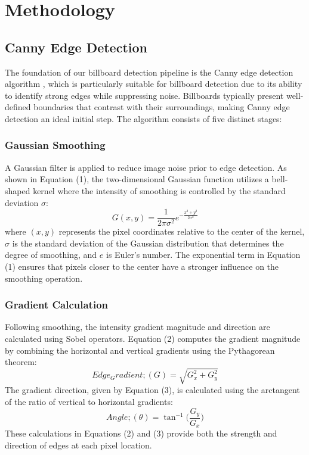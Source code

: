 \documentclass[12pt]{article}
\begin{document}
\section{Methodology}

\subsection{Canny Edge Detection}%
The foundation of our billboard detection pipeline is the Canny edge detection algorithm \cite{canny1986computational}, which is particularly suitable for billboard detection due to its ability to identify strong edges while suppressing noise. Billboards typically present well-defined boundaries that contrast with their surroundings, making Canny edge detection an ideal initial step. The algorithm consists of five distinct stages:

\subsubsection{Gaussian Smoothing}
A Gaussian filter\cite{Gauss} is applied to reduce image noise prior to edge detection. As shown in Equation (1), the two-dimensional Gaussian function utilizes a bell-shaped kernel where the intensity of smoothing is controlled by the standard deviation $\sigma$:
\begin{equation}
G(x,y) = \frac{1}{2\pi\sigma^2}e^{-\frac{x^2+y^2}{2\sigma^2}}
\end{equation}
where $(x,y)$ represents the pixel coordinates relative to the center of the kernel, $\sigma$ is the standard deviation of the Gaussian distribution that determines the degree of smoothing, and $e$ is Euler's number. The exponential term in Equation (1) ensures that pixels closer to the center have a stronger influence on the smoothing operation.
\subsubsection{Gradient Calculation}
Following smoothing, the intensity gradient magnitude and direction are calculated using Sobel\cite{Sobel} operators. Equation (2) computes the gradient magnitude by combining the horizontal and vertical gradients using the Pythagorean theorem:
\begin{equation}
Edge_Gradient ; (G) = \sqrt{G_x^2 + G_y^2}
\end{equation}
The gradient direction, given by Equation (3), is calculated using the arctangent of the ratio of vertical to horizontal gradients:
\begin{equation}
Angle ; (\theta) = \tan^{-1} \bigg(\frac{G_y}{G_x}\bigg)
\end{equation}
These calculations in Equations (2) and (3) provide both the strength and direction of edges at each pixel location.
\end{document}
